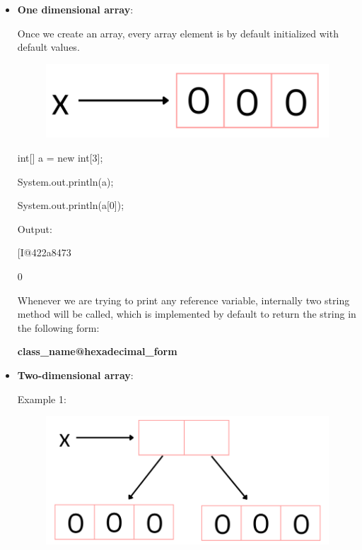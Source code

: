 \setlength{\columnsep}{3pt}
\begin{flushleft}
	\bigskip
	\begin{itemize}
		\item \textbf{One dimensional array}:\par
		
		Once we create an array, every array element is by default initialized with default values.
		
		\begin{figure}[h!]
			\centering
			\includegraphics[scale=.45]{content/chapter4/images/new1.png}
		\end{figure}	
		
		
		\begin{tcolorbox}[breakable,notitle,boxrule=1pt,colback=code,colframe=code]
			\color{black}
			\font=8pt
			int[] a = new int[3]; \par
			System.out.println(a); \par
			System.out.println(a[0]);
			\font=4pt
		\end{tcolorbox}
		
		Output:
		\begin{tcolorbox}[breakable,notitle,boxrule=-0pt,colback=output,colframe=output]
			\color{black}
			\font=8pt
			[I@422a8473 \par
			0
			\font=4pt
		\end{tcolorbox}	
		
		Whenever we are trying to print any reference variable, internally two string method will be called, which is implemented by default to return the string in the following form:
		\par
		\textbf{class\_name@hexadecimal\_form}
		
		\bigskip
		\item \textbf{Two-dimensional array}:  \par
		
		Example 1:
		\begin{figure}[h!]
			\centering
			\includegraphics[scale=.45]{content/chapter4/images/new2.png}
		\end{figure}	
		

\end{itemize}
\end{flushleft}
